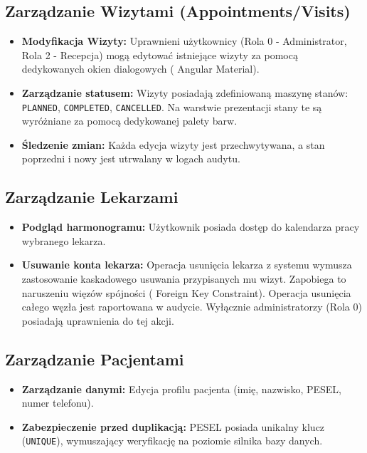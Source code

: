 \documentclass[a4paper,12pt]{report}
\begin{document}
\subsection{Zarządzanie Wizytami (Appointments/Visits)}
\begin{itemize}
    \item \textbf{Modyfikacja Wizyty:} Uprawnieni użytkownicy (Rola 0 - Administrator, Rola 2 - Recepcja) mogą edytować istniejące wizyty za pomocą dedykowanych okien dialogowych ( Angular Material).
    \item \textbf{Zarządzanie statusem:} Wizyty posiadają zdefiniowaną maszynę stanów: \texttt{PLANNED}, \texttt{COMPLETED}, \texttt{CANCELLED}. Na warstwie prezentacji stany te są wyróżniane za pomocą dedykowanej palety barw.
    \item \textbf{Śledzenie zmian:} Każda edycja wizyty jest przechwytywana, a stan poprzedni i nowy jest utrwalany w logach audytu.
\end{itemize}

\subsection{Zarządzanie Lekarzami}
\begin{itemize}
    \item \textbf{Podgląd harmonogramu:} Użytkownik posiada dostęp do kalendarza pracy wybranego lekarza.
    \item \textbf{Usuwanie konta lekarza:} Operacja usunięcia lekarza z systemu wymusza zastosowanie kaskadowego usuwania przypisanych mu wizyt. Zapobiega to naruszeniu więzów spójności ( Foreign Key Constraint). Operacja usunięcia całego węzła jest raportowana w audycie. Wyłącznie administratorzy (Rola 0) posiadają uprawnienia do tej akcji.
\end{itemize}

\subsection{Zarządzanie Pacjentami}
\begin{itemize}
    \item \textbf{Zarządzanie danymi:} Edycja profilu pacjenta (imię, nazwisko, PESEL, numer telefonu).
    \item \textbf{Zabezpieczenie przed duplikacją:} PESEL posiada unikalny klucz (\texttt{UNIQUE}), wymuszający weryfikację na poziomie silnika bazy danych.
\end{itemize}
\end{document}
